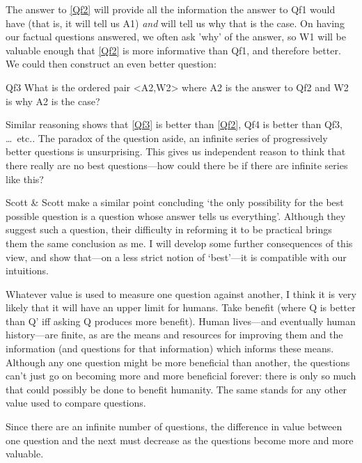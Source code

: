 The answer to \ref{Qf2} will provide all the information the answer to Qf1 would have (that is, it will tell us A1) \emph{and} will tell us why that is the case.
On having our factual questions answered, we often ask 'why' of the answer, so W1 will be valuable enough that \ref{Qf2} is more informative than Qf1, and therefore better.
We could then construct an even better question:

	\begin{principle}{Qf3}\label{Qf3}
	What is the ordered pair <A2,W2> where A2 is the answer to Qf2 and W2 is why A2 is the case?
	\end{principle}

Similar reasoning shows that \ref{Qf3} is better than \ref{Qf2}, Qf4 is better than Qf3, \ldots\ etc..
The paradox of the question aside, an infinite series of progressively better questions is unsurprising.
This gives us independent reason to think that there really are no best questions---how could there be if there are infinite series like this?

Scott \& Scott make a similar point concluding `the only possibility for the best possible question is a question whose answer tells us everything'.
\parencite[332]{Scott_1999}
Although they suggest such a question, their difficulty in reforming it to be practical brings them the same conclusion as me.
I will develop some further consequences of this view, and show that---on a less strict notion of `best'---it is compatible with our intuitions.

Whatever value is used to measure one question against another, I think it is very likely that it will have an upper limit for humans.
Take benefit (where Q is better than Q' iff asking Q produces more benefit).
Human lives---and eventually human history---are finite, as are the means and resources for improving them and the information (and questions for that information) which informs these means.
Although any one question might be more beneficial than another, the questions can't just go on becoming more and more beneficial forever: there is only so much that could possibly be done to benefit humanity.
The same stands for any other value used to compare questions.

Since there are an infinite number of questions, the difference in value between one question and the next must decrease as the questions become more and more valuable.

